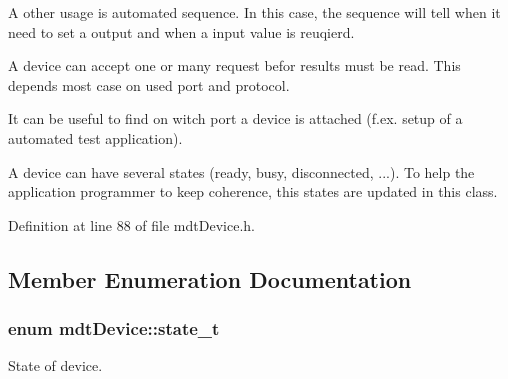 A other usage is automated sequence. In this case, the sequence will tell when it need to set a output and when a input value is reuqierd.

A device can accept one or many request befor results must be read. This depends most case on used port and protocol.

It can be useful to find on witch port a device is attached (f.ex. setup of a automated test application).

A device can have several states (ready, busy, disconnected, ...). To help the application programmer to keep coherence, this states are updated in this class. 

Definition at line 88 of file mdtDevice.h.



\subsection{Member Enumeration Documentation}
\hypertarget{classmdt_device_a39c301b1fda803dba0c9ab98164a9d1e}{
\subsubsection[{state\_\-t}]{\setlength{\rightskip}{0pt plus 5cm}enum {\bf mdtDevice::state\_\-t}}}
\label{classmdt_device_a39c301b1fda803dba0c9ab98164a9d1e}


State of device. 

